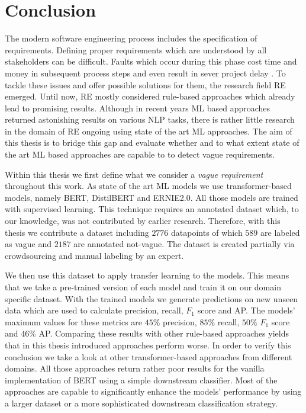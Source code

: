 \chapter{Conclusion}
\label{chp:conclusion}
The modern software engineering process includes the specification of requirements.
Defining proper requirements which are understood by all stakeholders can be difficult.
Faults which occur during this phase cost time and money in subsequent process steps \parencite{Mendez:2016} and even result in sever project delay \parencite{Femmer:2014}.
To tackle these issues and offer possible solutions for them, the research field \ac{RE} emerged.
Until now, \ac{RE} mostly considered rule-based approaches which already lead to promising results.
Although in recent years \ac{ML} based approaches returned astonishing results on various \ac{NLP} tasks, there is rather little research in the domain of \ac{RE} ongoing using state of the art \ac{ML} approaches.
The aim of this thesis is to bridge this gap and evaluate whether and to what extent state of the art \ac{ML} based approaches are capable to to detect vague requirements.

Within this thesis we first define what we consider a \textit{vague requirement} throughout this work.
As state of the art \ac{ML} models we use transformer-based models, namely \ac{BERT}, \ac{DistilBERT} and \ac{ERNIE2.0}.
All those models are trained with supervised learning.
This technique requires an annotated dataset which, to our knowledge, was not contributed by earlier research.
Therefore, with this thesis we contribute a dataset including $2776$ datapoints of which $589$ are labeled as vague and $2187$ are annotated not-vague.
The dataset is created partially via crowdsourcing and manual labeling by an expert.

We then use this dataset to apply transfer learning to the models.
This means that we take a pre-trained version of each model and train it on our domain specific dataset.
With the trained models we generate predictions on new unseen data which are used to calculate precision, recall, $F_1$ score and \ac{AP}.
The models' maximum values for these metrics are $45\%$ precision, $85\%$ recall, $50\%$ $F_1$ score and $46\%$ \ac{AP}.
Comparing these results with other rule-based approaches yields that in this thesis introduced approaches perform worse.
In order to verify this conclusion we take a look at other transformer-based approaches from different domains.
All those approaches return rather poor results for the vanilla implementation of \ac{BERT} using a simple downstream classifier.
Most of the approaches are capable to significantly enhance the models' performance by using a larger dataset or a more sophisticated downstream classification strategy.

